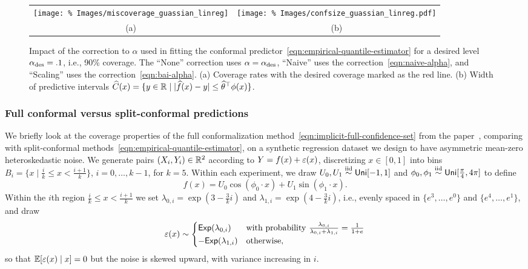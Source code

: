 \documentclass[11pt]{article}
\begin{document}
\begin{figure}[ht]
  \begin{center}
    \begin{tabular}{cc}
      \hspace{-1cm}
      \texttt{[image: \%
        Images/miscoverage\_guassian\_linreg]} &
      \hspace{-.5cm}
      \texttt{[image: \%
        Images/confsize\_guassian\_linreg.pdf]} \\
      (a) & (b)
    \end{tabular}
    \caption{\label{fig:simulation-correction-coverage} Impact of the
      correction to $\alpha$ used in fitting the conformal
      predictor~\eqref{eqn:empirical-quantile-estimator} for a desired level
      $\alpha_{\textup{des}} = .1$, i.e., 90\% coverage. The ``None'' correction
      uses $\alpha = \alpha_{\textup{des}}$, ``Naive'' uses the
      correction~\eqref{eqn:naive-alpha}, and ``Scaling'' uses the
      correction~\eqref{eqn:bai-alpha}.  (a) Coverage rates with the desired
      coverage marked as the red line. (b) Width of predictive intervals
      $\widehat{C}(x) = \{y \in \mathbb{R} \mid |\widehat{f}(x) - y| \le
      \widehat{\theta}^\top \phi(x)\}$.}
  \end{center}
\end{figure}

\subsubsection{Full conformal versus split-conformal predictions}
\label{sec:offline-sin-simulation}

We briefly look at the coverage properties of the full conformalization
method~\eqref{eqn:implicit-full-confidence-set} from the
paper~\citep{GibbsChCa23}, comparing with split-conformal
methods~\eqref{eqn:empirical-quantile-estimator}, on a synthetic regression
dataset we design to have asymmetric mean-zero heteroskedastic noise.
%
We generate pairs $(X_i, Y_i) \in \mathbb{R}^2$ according to
$Y = f(x) + \varepsilon(x)$,
discretizing $x \in [0, 1]$ into bins
$B_i = \{x \mid \frac{i}{k} \le x < \frac{i + 1}{k}\}$,
$i = 0, \ldots, k - 1$, for $k = 5$.
%
Within each experiment, we
draw $U_0, U_1 \stackrel{\rm iid}{\sim} \mathsf{Uni}[-1, 1]$ and
$\phi_0, \phi_1 \stackrel{\rm iid}{\sim} \mathsf{Uni}[\frac{\pi}{4}, 4 \pi]$
to define
\begin{equation*}
  f(x) = U_0 \cos(\phi_0 \cdot x)
  + U_1 \sin(\phi_1 \cdot x).
\end{equation*}
Within the $i$th region $\frac{i}{k} \le x < \frac{i + 1}{k}$ we
set $\lambda_{0,i} = \exp(3 - \frac{3}{k} i)$ and
$\lambda_{1,i} = \exp(4 - \frac{3}{k} i)$, i.e.,
evenly spaced in $\{e^{3}, \ldots, e^0\}$ and $\{e^{4}, \ldots, e^{1}\}$,
and draw
\begin{equation*}
  \varepsilon(x) \sim \begin{cases} \mathsf{Exp}(\lambda_{0,i})
    & \mbox{with probability}~
    \frac{\lambda_{0,i}}{\lambda_{0,i} + \lambda_{1,i}}
    = \frac{1}{1 + e} \\
    -\mathsf{Exp}(\lambda_{1,i})
    & \mbox{otherwise},
  \end{cases}
\end{equation*}
so that $\mathbb{E}[\varepsilon(x) \mid x] = 0$ but the noise is skewed upward,
with variance increasing in $i$.
\end{document}
